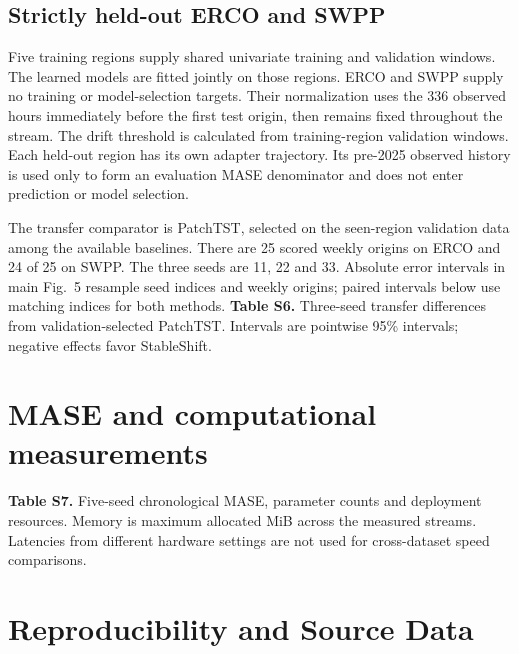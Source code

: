 \documentclass[11pt,a4paper]{article}
\begin{document}
\subsection{Strictly held-out ERCO and SWPP}
Five training regions supply shared univariate training and validation windows. The learned models are fitted jointly on those regions. ERCO and SWPP supply no training or model-selection targets. Their normalization uses the 336 observed hours immediately before the first test origin, then remains fixed throughout the stream. The drift threshold is calculated from training-region validation windows. Each held-out region has its own adapter trajectory. Its pre-2025 observed history is used only to form an evaluation MASE denominator and does not enter prediction or model selection.

The transfer comparator is PatchTST, selected on the seen-region validation data among the available baselines. There are 25 scored weekly origins on ERCO and 24 of 25 on SWPP. The three seeds are 11, 22 and 33. Absolute error intervals in main Fig.~5 resample seed indices and weekly origins; paired intervals below use matching indices for both methods.
\noindent\textbf{Table S6.} Three-seed transfer differences from validation-selected PatchTST. Intervals are pointwise 95\% intervals; negative effects favor StableShift.


\section{MASE and computational measurements}
\noindent\textbf{Table S7.} Five-seed chronological MASE, parameter counts and deployment resources. Memory is maximum allocated MiB across the measured streams. Latencies from different hardware settings are not used for cross-dataset speed comparisons.


\section{Reproducibility and Source Data}
\end{document}
